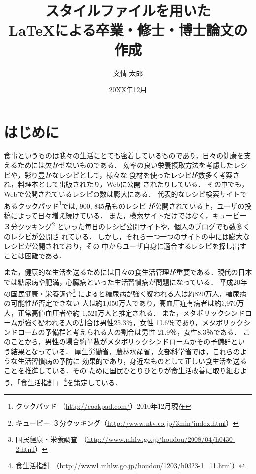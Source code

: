 \documentclass[11pt,titlepage,uplatex]{ujreport}
\title{スタイルファイルを用いた\\
       \LaTeX による卒業・修士・博士論文の作成}
\author{文情 太郎}
\date{20XX年12月}
\begin{document}
\makeicover
\abstractpage
\tableofcontents

\newpage
{}	%


\chapter{はじめに}
食事というものは我々の生活にとても密着しているものであり，日々の健康を支
えるためには欠かせないものである．
効率の良い栄養摂取方法を考慮したレシピや，彩り豊かなレシピとして，様々な
食材を使ったレシピが数多く考案され，料理本として出版されたり，Webに公開
されたりしている．
その中でも，Webで公開されているレシピの数は膨大にある．
代表的なレシピ検索サイトであるクックパッド\footnote{クックパッド
（\url{http://cookpad.com/}）2010年12月現在}では, 900, 845品ものレシピ
が公開されている上，ユーザの投稿によって日々増え続けている．
また，検索サイトだけではなく，キューピー３分クッキング\footnote{キューピー
３分クッキング（\url{http://www.ntv.co.jp/3min/index.html}）}
といった毎日のレシピ公開サイトや，個人のブログでも数多くのレシピが公開さ
れている．
しかし，それら一つ一つのサイトの中には膨大なレシピが公開されており，その
中からユーザ自身に適合するレシピを探し出すことは困難である．

また，健康的な生活を送るためには日々の食生活管理が重要である．現代の日本
では糖尿病や肥満，心臓病といった生活習慣病が問題になっている．
平成20年の国民健康・栄養調査\footnote{国民健康・栄養調査
（\url{http://www.mhlw.go.jp/houdou/2008/04/h0430-2.html}）}
によると糖尿病が強く疑われる人は約820万人，糖尿病の可能性が否定できない
人は約1,050万人であり，高血圧症有病者は約3,970万人，正常高値血圧者や約
1,520万人と推定される．
また，メタボリックシンドロームが強く疑われる人の割合は男性25.3％，女性
10.6％であり，メタボリックシンドロームの予備群と考えられる人の割合は男性
21.9％，女性8.3％である．
このことから，男性の場合約半数がメタボリックシンドロームかその予備群とい
う結果となっている．
厚生労働省，農林水産省，文部科学省では，これらのような生活習慣病の予防に
効果的であり，身近なものとして正しい食生活を送ることを推進している．その
ために国民ひとりひとりが食生活改善に取り組むよう，「食生活指針」
\footnote{食生活指針
（\url{http://www1.mhlw.go.jp/houdou/1203/h0323-1\_11.html}）}を策定している．
\end{document}

